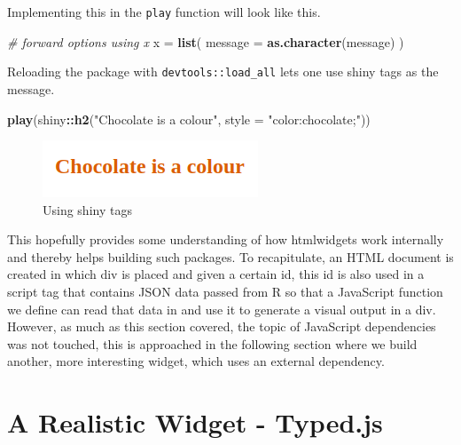 \documentclass[
]{krantz}
\makeatletter
\newenvironment{Shaded}{\begin{snugshade}}{\end{snugshade}}
\newcommand{\CommentTok}[1]{\textcolor[rgb]{0.37,0.37,0.37}{\textit{#1}}}
\newcommand{\DataTypeTok}[1]{\textcolor[rgb]{0.27,0.27,0.27}{#1}}
\newcommand{\KeywordTok}[1]{\textcolor[rgb]{0.27,0.27,0.27}{\textbf{#1}}}
\newcommand{\NormalTok}[1]{#1}
\newcommand{\OperatorTok}[1]{\textcolor[rgb]{0.43,0.43,0.43}{\textbf{#1}}}
\newcommand{\StringTok}[1]{\textcolor[rgb]{0.5,0.5,0.5}{#1}}
\newenvironment{kframe}{%
\medskip{}
\setlength{\fboxsep}{.8em}
 \def\at@end@of@kframe{}%
 \ifinner\ifhmode%
  \def\at@end@of@kframe{\end{minipage}}%
  \begin{minipage}{\columnwidth}%
 \fi\fi%
 \def\FrameCommand##1{\hskip\@totalleftmargin \hskip-\fboxsep
 \colorbox{shadecolor}{##1}\hskip-\fboxsep
     \hskip-\linewidth \hskip-\@totalleftmargin \hskip\columnwidth}%
 \MakeFramed {\advance\hsize-\width
   \@totalleftmargin\z@ \linewidth\hsize
   \@setminipage}}%
 {\par\unskip\endMakeFramed%
 \at@end@of@kframe}
\renewenvironment{Shaded}{\begin{kframe}}{\end{kframe}}
\makeatother
\begin{document}
Implementing this in the \texttt{play} function will look like this.

\begin{Shaded}
\begin{Highlighting}[]
\CommentTok{\# forward options using x}
\NormalTok{x =}\StringTok{ }\KeywordTok{list}\NormalTok{(}
  \DataTypeTok{message =} \KeywordTok{as.character}\NormalTok{(message)}
\NormalTok{)}
\end{Highlighting}
\end{Shaded}

Reloading the package with \texttt{devtools::load\_all} lets one use shiny tags as the message.

\begin{Shaded}
\begin{Highlighting}[]
\KeywordTok{play}\NormalTok{(shiny}\OperatorTok{::}\KeywordTok{h2}\NormalTok{(}\StringTok{"Chocolate is a colour"}\NormalTok{, }\DataTypeTok{style =} \StringTok{"color:chocolate;"}\NormalTok{))}
\end{Highlighting}
\end{Shaded}

\begin{figure}
\centering
\includegraphics{images/playground-color.png}
\caption{Using shiny tags}
\end{figure}

This hopefully provides some understanding of how htmlwidgets work internally and thereby helps building such packages. To recapitulate, an HTML document is created in which div is placed and given a certain id, this id is also used in a script tag that contains JSON data passed from R so that a JavaScript function we define can read that data in and use it to generate a visual output in a div. However, as much as this section covered, the topic of JavaScript dependencies was not touched, this is approached in the following section where we build another, more interesting widget, which uses an external dependency.

\hypertarget{a-realistic-widget---typed.js}{%
\chapter{A Realistic Widget - Typed.js}\label{a-realistic-widget---typed.js}}
\end{document}
